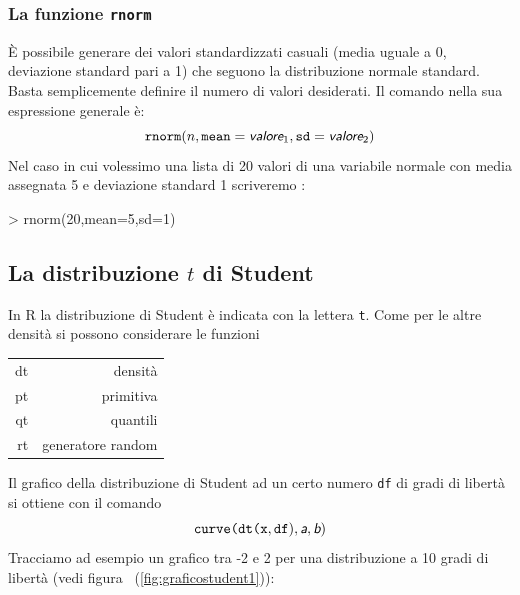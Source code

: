 \documentclass[onecolumn,12pt]{book}
\newcommand{\varia}[1]{\textsl{\textsf{#1}}}
\begin{document}
 \subsubsection{La funzione \texttt{rnorm}}
\`E possibile generare dei valori standardizzati casuali (media uguale a 0, deviazione standard pari a 1) che seguono la distribuzione normale standard. Basta semplicemente definire il numero di valori desiderati.
Il comando nella sua espressione generale \`e:
\begin{equation}\texttt{rnorm}(n,\texttt{mean}=\varia{valore}_1,\texttt{sd}=\varia{valore}_2)\end{equation}
Nel caso in cui volessimo una lista di 20 valori di una variabile normale con media assegnata 5 e deviazione standard 1 scriveremo :

\begin{Schunk}
\begin{Sinput}
> rnorm(20,mean=5,sd=1)
\end{Sinput}
\end{Schunk}
\subsection{La distribuzione $t$ di Student}
In \textsf{R} la distribuzione di Student \`e indicata con la lettera  \texttt{t}.  Come per le altre densit\`a  si possono considerare le funzioni\vskip5pt
\begin{tabular}{|r|r |}
\hline
dt  &densit\`a\\
pt  &primitiva\\
qt & quantili\\
rt  &generatore random\\
\hline
\end{tabular}
\vskip10pt
Il grafico della distribuzione di Student ad un certo numero \texttt{df} di gradi di libert\`a  si ottiene con il comando
\begin{equation*}
\texttt{curve(dt(x},\texttt{df}),\varia{a},\varia{b})
\end{equation*}
Tracciamo ad esempio un grafico tra -2 e 2 per una distribuzione a 10 gradi di libert\`a (vedi figura ~(\ref{fig:graficostudent1})):
\end{document}
